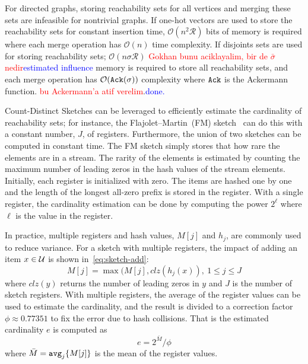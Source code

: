 \documentclass[10pt,journal,compsoc]{IEEEtran}
\newcommand\ggx[1]{\textcolor{blue}{#1}}
\newcommand\kktodo[1]{\textcolor{red}{#1}}
\begin{document}
For directed graphs, storing reachability sets for all vertices and merging these sets are infeasible for nontrivial graphs. 
If one-hot vectors are used to store the reachability sets for constant insertion time, $\mathcal{O}(n^2\mathcal{R})$ bits of memory is required where each merge operation has $\mathcal{O}(n)$ time complexity. 
If disjoints sets are used for storing reachability sets; $\mathcal{O}(n{\sigma}\mathcal{R})$ \kktodo{Gokhan bunu aciklayalim, bir de $\bar{\sigma}$ nedir}\ggx{estimated influence} memory is required to store all reachability sets, and each merge operation has $\mathcal{O}({\tt Ack}(\sigma))$ complexity where ${\tt Ack}$ is the Ackermann\cite{ackermann1928hilbertschen} function. \kktodo{bu Ackermann'a atif verelim}.\ggx{done.}

Count-Distinct Sketches can be leveraged to efficiently estimate the cardinality of reachability sets; for instance, the Flajolet–Martin~(FM) sketch~\cite{flajolet1985probabilistic} can do this with a constant number, $J$, of registers. Furthermore, the union of two sketches can be computed in constant time. The FM sketch simply stores that how rare the elements are in a stream. The rarity of the elements is estimated by counting the maximum number of leading zeros in the hash values of the stream elements. Initially, each register is initialized with zero. The items are hashed one by one and the length of the longest all-zero prefix is stored in the register. With a single register, the cardinality estimation can be done by computing the power $2^\ell$ where $\ell$ is the value in the register.

In practice, multiple registers and hash values, $M[j]$ and $h_j$, are commonly used to reduce variance. For a sketch with multiple registers, the impact of adding an item $x \in \cal{U}$ is shown in~\eqref{eq:sketch-add}:
\begin{equation}
    \label{eq:sketch-add}
    M[j] = \max(M[j], clz(h_j(x)),~1 \leq j \leq J
\end{equation} where $clz(y)$ returns the number of leading zeros in $y$ and $J$ is the number of sketch registers. With multiple registers, the average of the register values can be used to estimate the cardinality, and the result is divided to a correction factor $\phi \approx 0.77351$ to fix the error due to hash collisions. That is the estimated cardinality $e$ is computed as
\begin{equation}
    \label{eq:sketch-estimate}
    e = 2^{\bar{M}}/\phi
\end{equation} 
where $\bar{M} = {\tt{avg}}_j\{M[j]\}$ is the mean of the register values.
\end{document}
